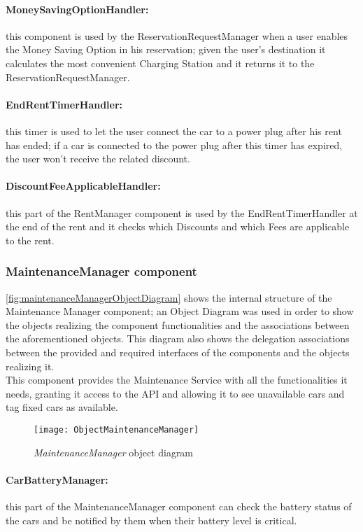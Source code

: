 \paragraph{MoneySavingOptionHandler:} this component is used by the ReservationRequestManager when a user enables the Money Saving Option in his reservation; given the user's destination it calculates the most convenient Charging Station and it returns it to the ReservationRequestManager.
\paragraph{EndRentTimerHandler:} this timer is used to let the user connect the car to a power plug after his rent has ended; if a car is connected to the power plug after this timer has expired, the user won't receive the related discount.
\paragraph{DiscountFeeApplicableHandler:} this part of the RentManager component is used by the EndRentTimerHandler at the end of the rent and it checks which Discounts and which Fees are applicable to the rent.

\clearpage
\subsubsection{MaintenanceManager component}
\autoref{fig:maintenanceManagerObjectDiagram} shows the internal structure of the Maintenance Manager component; an Object Diagram was used in order to show the objects realizing the component functionalities and the associations between the aforementioned objects. This diagram also shows the delegation associations between the provided and required interfaces of the components and the objects realizing it.
\\
This component provides the Maintenance Service with all the functionalities it needs, granting it access to the API and allowing it to see unavailable cars and tag fixed cars as available.
\begin{figure}[h!]
	\centering
	\texttt{[image: ObjectMaintenanceManager]}
	\caption{
		\label{fig:maintenanceManagerObjectDiagram} 
		\emph{MaintenanceManager} object diagram
	}
\end{figure}

\paragraph{CarBatteryManager:} this part of the MaintenanceManager component can check the   battery status of the cars and be notified by them when their battery level is critical.
